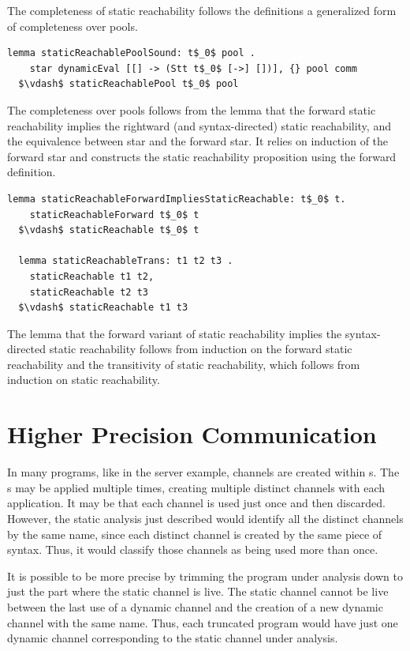 \documentclass[letterpaper, 11pt]{extarticle}
\begin{document}
The completeness of static reachability follows the definitions
a generalized form of completeness over pools.

\begin{lstlisting}[language=logic, mathescape]
  lemma staticReachablePoolSound: t$_0$ pool .
    star dynamicEval [[] -> (Stt t$_0$ [->] [])], {} pool comm 
  $\vdash$ staticReachablePool t$_0$ pool
\end{lstlisting}

The completeness over pools follows from the lemma that the forward
static reachability implies the rightward (and syntax-directed) static reachability,
and the equivalence between star and the forward star. It relies on induction of the
forward star and constructs the static reachability
proposition using the forward definition. 

\begin{lstlisting}[language=logic, mathescape]
  lemma staticReachableForwardImpliesStaticReachable: t$_0$ t. 
    staticReachableForward t$_0$ t
  $\vdash$ staticReachable t$_0$ t

  lemma staticReachableTrans: t1 t2 t3 .
    staticReachable t1 t2,
    staticReachable t2 t3
  $\vdash$ staticReachable t1 t3
\end{lstlisting}

The lemma that the forward variant of static reachability implies the syntax-directed static
reachability follows from induction on the forward static reachability and the
transitivity of static reachability, which follows from induction on static reachability.

\section{Higher Precision Communication} \label{high-precision}
In many programs, like in the server example, channels are created within s.
The s may be applied multiple times, creating multiple distinct channels
with each application. It may be that each channel is used just once and then discarded.
However, the static analysis just described would identify all the distinct channels by the
same name, since each distinct channel is created by the same piece of syntax.
Thus, it would classify those channels as being used more than once.

It is possible to be more precise by trimming the program under analysis down to just the part
where the static channel is live. The static channel cannot be live between the last use of a
dynamic channel and the creation of a new dynamic channel with the same name. Thus, each
truncated program would have just one dynamic channel corresponding to the static channel under
analysis. 
\end{document}
